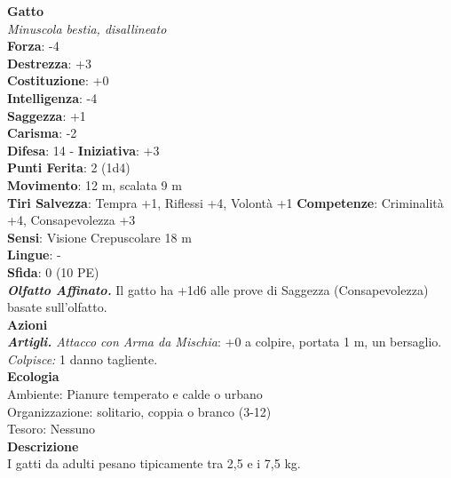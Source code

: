 \begin{multicols}{2}
\medskip\textbf{Gatto}\\
\emph{Minuscola bestia, disallineato}\\
\textbf{Forza}: -4\\
\textbf{Destrezza}: +3\\
\textbf{Costituzione}: +0\\
\textbf{Intelligenza}: -4\\
\textbf{Saggezza}: +1\\
\textbf{Carisma}: -2\\
\textbf{Difesa}: 14 - \textbf{Iniziativa}: +3\\
\textbf{Punti Ferita}: 2 (1d4)\\
\textbf{Movimento}: 12 m, scalata 9 m\\
\textbf{Tiri Salvezza}:  Tempra +1, Riflessi +4, Volontà +1 
\textbf{Competenze}: Criminalità +4, Consapevolezza +3\\
\textbf{Sensi}: Visione Crepuscolare 18 m\\
\textbf{Lingue}: -\\
\textbf{Sfida}: 0 (10 PE)\smallskip\\
\emph{\textbf{Olfatto Affinato.}} Il gatto ha +1d6 alle prove di Saggezza (Consapevolezza) basate sull'olfatto.\\
\smallskip\textbf{Azioni}\\
\emph{\textbf{Artigli.} Attacco con Arma da Mischia}: +0 a colpire, portata 1 m, un bersaglio.\\
\emph{Colpisce:} 1 danno tagliente.\\
\textbf{Ecologia}\\
Ambiente: Pianure temperato e calde o urbano\\
Organizzazione: solitario, coppia o branco (3-12)\\
Tesoro: Nessuno\\
\textbf{Descrizione}\\
I gatti da adulti pesano tipicamente tra 2,5 e i 7,5 kg. \\


\end{multicols}
